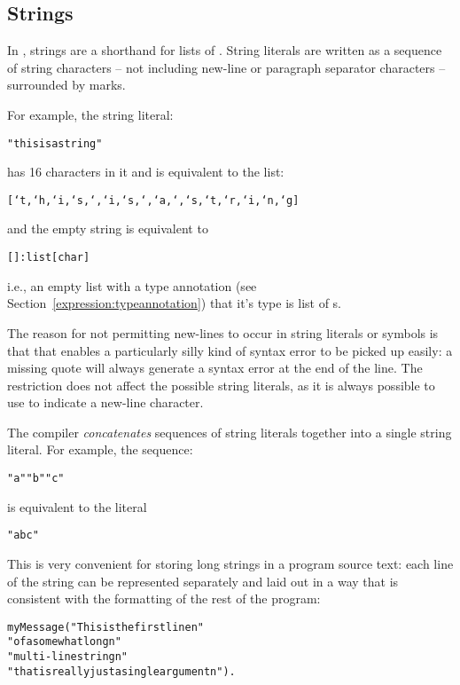 \subsection{Strings}
\label{token:string}
\label{expression:string}
In \go, strings are a shorthand for lists of . String literals are written as a sequence of string characters -- not including new-line or paragraph separator characters -- surrounded by  marks.

For example, the string literal:
\begin{alltt}
"this is a string"
\end{alltt}
has 16 characters in it and is equivalent to the list:
\begin{alltt}
[`t,`h,`i,`s,` ,`i,`s,` ,`a,` ,`s,`t,`r,`i,`n,`g]
\end{alltt}
and the empty string  is equivalent to
\begin{alltt}
[]:list[char]
\end{alltt}
i.e., an empty list with a type annotation (see Section~\vref{expression:typeannotation}) that it's type is list of s.

\begin{aside}
The reason for not permitting new-lines to occur in string literals or symbols is that that enables a particularly silly kind of syntax error to be picked up easily: a missing quote will always generate a syntax error at the end of the line. The restriction does not affect the possible string literals, as it is always possible to use  to indicate a new-line character.
\end{aside}

The \go compiler \emph{concatenates} sequences of string literals together into a single string literal. For example, the sequence:
\begin{alltt}
"a" "b" "c"
\end{alltt}
is equivalent to the  literal
\begin{alltt}
"abc"
\end{alltt}
This is very convenient for storing long strings in a program source text: each line of the string can be represented separately and laid out in a way that is consistent with the formatting of the rest of the program:
\begin{alltt}
myMessage("This is the first line\bsl{}n"
          "of a somewhat long\bsl{}n"
          "multi-line string\bsl{}n"
          "that is really just a single argument\bsl{}n").
\end{alltt}

